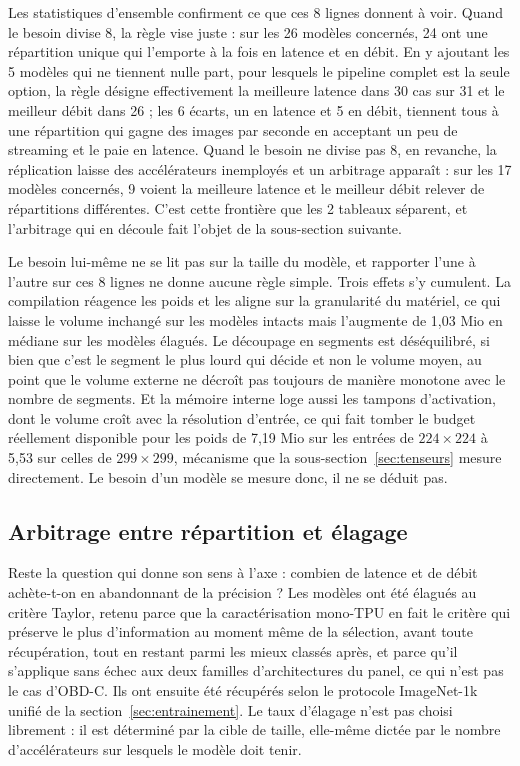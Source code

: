 \documentclass[11pt,a4paper]{report}
\begin{document}
Les statistiques d'ensemble confirment ce que ces 8 lignes donnent à voir. Quand le besoin divise 8, la règle vise juste : sur les 26 modèles concernés, 24 ont une répartition unique qui l'emporte à la fois en latence et en débit. En y ajoutant les 5 modèles qui ne tiennent nulle part, pour lesquels le pipeline complet est la seule option, la règle désigne effectivement la meilleure latence dans 30 cas sur 31 et le meilleur débit dans 26 ; les 6 écarts, un en latence et 5 en débit, tiennent tous à une répartition qui gagne des images par seconde en acceptant un peu de streaming et le paie en latence. Quand le besoin ne divise pas 8, en revanche, la réplication laisse des accélérateurs inemployés et un arbitrage apparaît : sur les 17 modèles concernés, 9 voient la meilleure latence et le meilleur débit relever de répartitions différentes. C'est cette frontière que les 2 tableaux séparent, et l'arbitrage qui en découle fait l'objet de la sous-section suivante.

Le besoin lui-même ne se lit pas sur la taille du modèle, et rapporter l'une à l'autre sur ces 8 lignes ne donne aucune règle simple. Trois effets s'y cumulent. La compilation réagence les poids et les aligne sur la granularité du matériel, ce qui laisse le volume inchangé sur les modèles intacts mais l'augmente de 1,03 Mio en médiane sur les modèles élagués. Le découpage en segments est déséquilibré, si bien que c'est le segment le plus lourd qui décide et non le volume moyen, au point que le volume externe ne décroît pas toujours de manière monotone avec le nombre de segments. Et la mémoire interne loge aussi les tampons d'activation, dont le volume croît avec la résolution d'entrée, ce qui fait tomber le budget réellement disponible pour les poids de 7,19 Mio sur les entrées de $224 \times 224$ à 5,53 sur celles de $299 \times 299$, mécanisme que la sous-section~\ref{sec:tenseurs} mesure directement. Le besoin d'un modèle se mesure donc, il ne se déduit pas.

\subsection{Arbitrage entre répartition et élagage}

Reste la question qui donne son sens à l'axe : combien de latence et de débit achète-t-on en abandonnant de la précision ? Les modèles ont été élagués au critère Taylor, retenu parce que la caractérisation mono-TPU en fait le critère qui préserve le plus d'information au moment même de la sélection, avant toute récupération, tout en restant parmi les mieux classés après, et parce qu'il s'applique sans échec aux deux familles d'architectures du panel, ce qui n'est pas le cas d'OBD-C. Ils ont ensuite été récupérés selon le protocole ImageNet-1k unifié de la section~\ref{sec:entrainement}. Le taux d'élagage n'est pas choisi librement : il est déterminé par la cible de taille, elle-même dictée par le nombre d'accélérateurs sur lesquels le modèle doit tenir.
\end{document}
